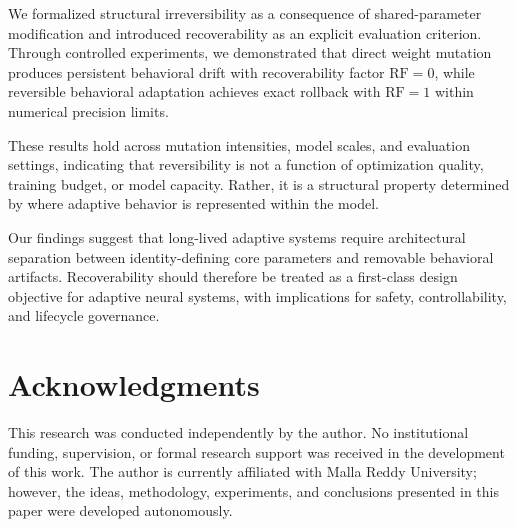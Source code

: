 \documentclass{article}
\begin{document}
	We formalized structural irreversibility as a consequence of
	shared-parameter modification and introduced recoverability
	as an explicit evaluation criterion.
	Through controlled experiments, we demonstrated that
	direct weight mutation produces persistent behavioral drift
	with recoverability factor $\mathrm{RF}=0$,
	while reversible behavioral adaptation achieves
	exact rollback with $\mathrm{RF}=1$ within numerical precision limits.
	
	These results hold across mutation intensities,
	model scales, and evaluation settings,
	indicating that reversibility is not a function of optimization quality,
	training budget, or model capacity.
	Rather, it is a structural property determined by
	where adaptive behavior is represented within the model.
	
	Our findings suggest that long-lived adaptive systems
	require architectural separation between identity-defining
	core parameters and removable behavioral artifacts.
	Recoverability should therefore be treated as a first-class
	design objective for adaptive neural systems,
	with implications for safety, controllability,
	and lifecycle governance.
	
	\section*{Acknowledgments}
	\label{ack}
	
	This research was conducted independently by the author. 
	No institutional funding, supervision, or formal research support was received in the development of this work. 
	The author is currently affiliated with Malla Reddy University; however, the ideas, methodology, experiments, and conclusions presented in this paper were developed autonomously.
	
	  
	  
	
	
\end{document}
